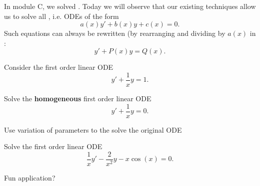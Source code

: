 \begin{applicationActivities}

\begin{observation}
In module C, we solved .
\vfill
Today we will observe that our existing techniques allow us to solve all , i.e. ODEs of the form
\[a(x)y'+b(x)y+c(x)=0.\]
Such equations can always be rewritten (by rearranging and dividing by \(a(x)\) in :
\[y'+P(x)y=Q(x).\]
\end{observation}

\begin{activity}{15}
Consider the first order linear ODE \[y'+\frac{1}{x}y=1.\]
\begin{subactivity}
Solve the \textbf{homogeneous} first order linear ODE \[y'+\frac{1}{x}y=0.\]
\end{subactivity}
\begin{subactivity}
Use variation of parameters to the solve the original ODE
\end{subactivity}
\end{activity}

\begin{activity}{15}
Solve the first order linear ODE \[\frac{1}{x}y'-\frac{2}{x^2}y-x\cos(x) = 0.\]
\end{activity}

\begin{activity}
Fun application?
\end{activity}

\end{applicationActivities}
